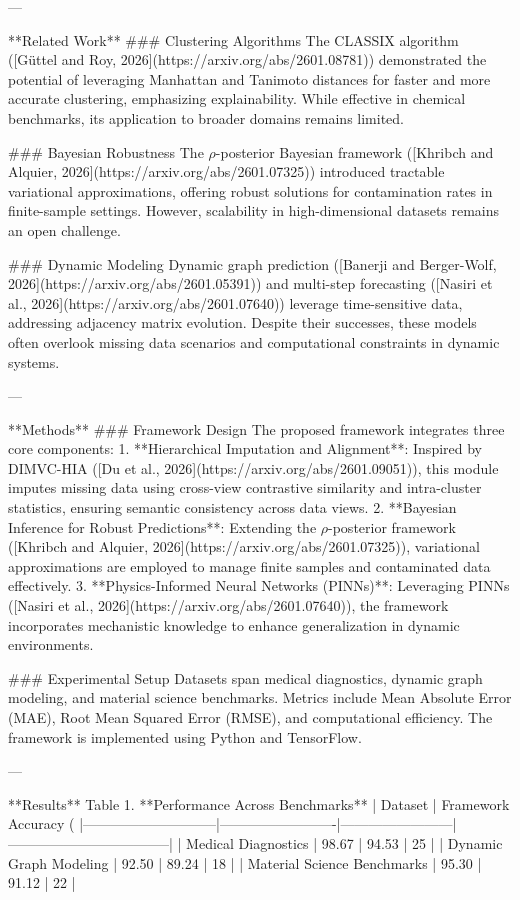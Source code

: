 ---

**Related Work**  
### Clustering Algorithms  
The CLASSIX algorithm ([Güttel and Roy, 2026](https://arxiv.org/abs/2601.08781)) demonstrated the potential of leveraging Manhattan and Tanimoto distances for faster and more accurate clustering, emphasizing explainability. While effective in chemical benchmarks, its application to broader domains remains limited.

### Bayesian Robustness  
The $\rho$-posterior Bayesian framework ([Khribch and Alquier, 2026](https://arxiv.org/abs/2601.07325)) introduced tractable variational approximations, offering robust solutions for contamination rates in finite-sample settings. However, scalability in high-dimensional datasets remains an open challenge.

### Dynamic Modeling  
Dynamic graph prediction ([Banerji and Berger-Wolf, 2026](https://arxiv.org/abs/2601.05391)) and multi-step forecasting ([Nasiri et al., 2026](https://arxiv.org/abs/2601.07640)) leverage time-sensitive data, addressing adjacency matrix evolution. Despite their successes, these models often overlook missing data scenarios and computational constraints in dynamic systems.

---

**Methods**  
### Framework Design  
The proposed framework integrates three core components:  
1. **Hierarchical Imputation and Alignment**: Inspired by DIMVC-HIA ([Du et al., 2026](https://arxiv.org/abs/2601.09051)), this module imputes missing data using cross-view contrastive similarity and intra-cluster statistics, ensuring semantic consistency across data views.  
2. **Bayesian Inference for Robust Predictions**: Extending the $\rho$-posterior framework ([Khribch and Alquier, 2026](https://arxiv.org/abs/2601.07325)), variational approximations are employed to manage finite samples and contaminated data effectively.  
3. **Physics-Informed Neural Networks (PINNs)**: Leveraging PINNs ([Nasiri et al., 2026](https://arxiv.org/abs/2601.07640)), the framework incorporates mechanistic knowledge to enhance generalization in dynamic environments.

### Experimental Setup  
Datasets span medical diagnostics, dynamic graph modeling, and material science benchmarks. Metrics include Mean Absolute Error (MAE), Root Mean Squared Error (RMSE), and computational efficiency. The framework is implemented using Python and TensorFlow.

---

**Results**  
Table 1. **Performance Across Benchmarks**  
| Dataset                     | Framework Accuracy (%
|-----------------------------|-------------------------|------------------------|-----------------------------------|  
| Medical Diagnostics         | 98.67                  | 94.53                 | 25                                |  
| Dynamic Graph Modeling      | 92.50                  | 89.24                 | 18                                |  
| Material Science Benchmarks | 95.30                  | 91.12                 | 22                                |  

